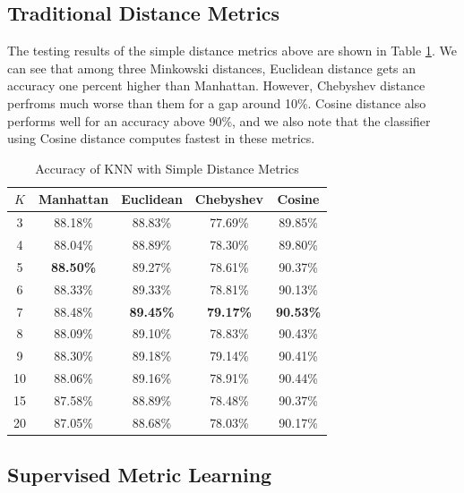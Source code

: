 
\subsection{Traditional Distance Metrics}

The testing results of the simple distance metrics above are shown in Table \ref{tab:simple}. We can see that among three Minkowski distances, Euclidean distance gets an accuracy one percent higher than Manhattan. However, Chebyshev distance perfroms much worse than them for a gap around 10\%. Cosine distance also performs well for an accuracy above 90\%, and we also note that the classifier using Cosine distance 
computes fastest in these metrics.

\begin{table}[htbp]
    \centering
    \caption{Accuracy of KNN with Simple Distance Metrics}
    \begin{tabular}{@{}ccccc@{}}
    \toprule
    $K$     &   Manhattan   &   Euclidean   &   Chebyshev   &   Cosine  \\ \midrule
    3       &   88.18\%     &   88.83\%     &   77.69\%     &  89.85\%  \\
    4       &   88.04\%     &   88.89\%     &   78.30\%     &   89.80\% \\
    5       &   \textbf{88.50\%} &   89.27\%&   78.61\%     &   90.37\% \\
    6       &   88.33\%     &   89.33\%     &   78.81\%     &   90.13\% \\
    7       &   88.48\%     &   \textbf{89.45\%} &   \textbf{79.17\%}   &   \textbf{90.53\%}   \\ 
    8       &   88.09\%     &   89.10\%     &   78.83\%     &   90.43\% \\
    9       &   88.30\%     &   89.18\%     &   79.14\%     &   90.41\% \\
    10      &   88.06\%     &   89.16\%     &   78.91\%     &   90.44\% \\
    15      &   87.58\%     &   88.89\%     &   78.48\%     &   90.37\% \\
    20      &   87.05\%     &   88.68\%     &   78.03\%     &   90.17\% \\\bottomrule
    \end{tabular}
    \label{tab:simple}
\end{table}



\subsection{Supervised Metric Learning}


